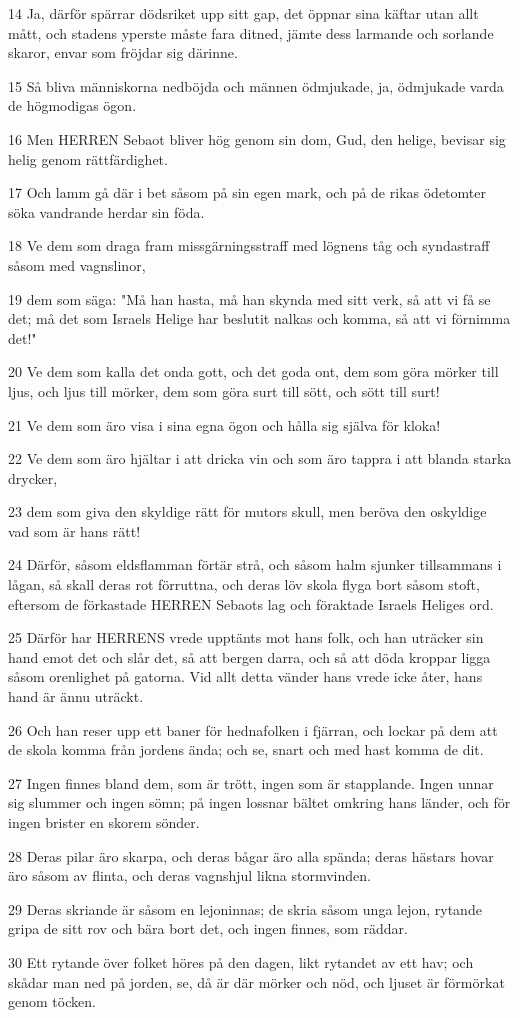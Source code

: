 \par 14 Ja, därför spärrar dödsriket upp sitt gap, det öppnar sina käftar utan allt mått, och stadens yperste måste fara ditned, jämte dess larmande och sorlande skaror, envar som fröjdar sig därinne.
\par 15 Så bliva människorna nedböjda och männen ödmjukade, ja, ödmjukade varda de högmodigas ögon.
\par 16 Men HERREN Sebaot bliver hög genom sin dom, Gud, den helige, bevisar sig helig genom rättfärdighet.
\par 17 Och lamm gå där i bet såsom på sin egen mark, och på de rikas ödetomter söka vandrande herdar sin föda.
\par 18 Ve dem som draga fram missgärningsstraff med lögnens tåg och syndastraff såsom med vagnslinor,
\par 19 dem som säga: "Må han hasta, må han skynda med sitt verk, så att vi få se det; må det som Israels Helige har beslutit nalkas och komma, så att vi förnimma det!"
\par 20 Ve dem som kalla det onda gott, och det goda ont, dem som göra mörker till ljus, och ljus till mörker, dem som göra surt till sött, och sött till surt!
\par 21 Ve dem som äro visa i sina egna ögon och hålla sig själva för kloka!
\par 22 Ve dem som äro hjältar i att dricka vin och som äro tappra i att blanda starka drycker,
\par 23 dem som giva den skyldige rätt för mutors skull, men beröva den oskyldige vad som är hans rätt!
\par 24 Därför, såsom eldsflamman förtär strå, och såsom halm sjunker tillsammans i lågan, så skall deras rot förruttna, och deras löv skola flyga bort såsom stoft, eftersom de förkastade HERREN Sebaots lag och föraktade Israels Heliges ord.
\par 25 Därför har HERRENS vrede upptänts mot hans folk, och han uträcker sin hand emot det och slår det, så att bergen darra, och så att döda kroppar ligga såsom orenlighet på gatorna. Vid allt detta vänder hans vrede icke åter, hans hand är ännu uträckt.
\par 26 Och han reser upp ett baner för hednafolken i fjärran, och lockar på dem att de skola komma från jordens ända; och se, snart och med hast komma de dit.
\par 27 Ingen finnes bland dem, som är trött, ingen som är stapplande. Ingen unnar sig slummer och ingen sömn; på ingen lossnar bältet omkring hans länder, och för ingen brister en skorem sönder.
\par 28 Deras pilar äro skarpa, och deras bågar äro alla spända; deras hästars hovar äro såsom av flinta, och deras vagnshjul likna stormvinden.
\par 29 Deras skriande är såsom en lejoninnas; de skria såsom unga lejon, rytande gripa de sitt rov och bära bort det, och ingen finnes, som räddar.
\par 30 Ett rytande över folket höres på den dagen, likt rytandet av ett hav; och skådar man ned på jorden, se, då är där mörker och nöd, och ljuset är förmörkat genom töcken.

